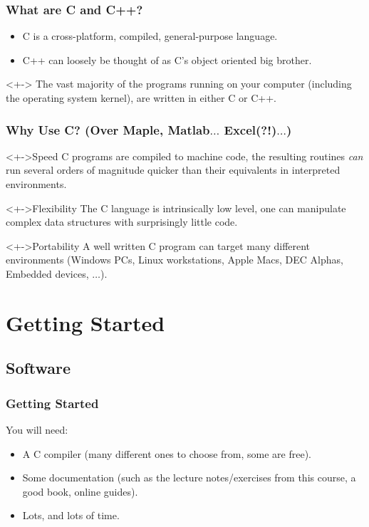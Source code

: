 \documentclass[smaller,table]{beamer} %
\begin{document}
\begin{frame}
\frametitle{What are C and C++?}
\begin{itemize}
\item C is a cross-platform, compiled, general-purpose language.
\item C++ can loosely be thought of as C's object oriented big brother.
\end{itemize}
\begin{alertblock}<+->{}
The vast majority of the programs running on your computer (including the operating system kernel), are written in either C or C++.
\end{alertblock}
\end{frame}


\begin{frame}
\frametitle{Why Use C? (Over Maple, Matlab$\ldots$ Excel(?!)$\ldots$)}
\begin{block}<+->{Speed}
C programs are compiled to machine code, the resulting routines \emph{can} run several orders of magnitude quicker than their equivalents in interpreted environments.
\end{block}

\begin{block}<+->{Flexibility}
The C language is intrinsically low level, one can manipulate complex data structures with surprisingly little code.
\end{block}

\begin{block}<+->{Portability}
A well written C program can target many different environments (Windows PCs, Linux workstations, Apple Macs, DEC Alphas, Embedded devices, $\ldots$).
\end{block}
\end{frame}

\section{Getting Started}
\subsection{Software}
\begin{frame}
\frametitle{Getting Started}
You will need:
\begin{itemize}
\item A C compiler (many different ones to choose from, some are free).
\item Some documentation (such as the lecture notes/exercises from this course,
a good book, online guides).
\item Lots, and lots of time.
\end{itemize}
\end{frame}
\end{document}
